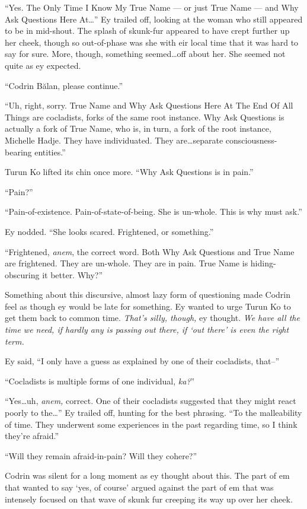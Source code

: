 ``Yes. The Only Time I Know My True Name — or just True Name — and Why Ask Questions Here At\ldots{}'' Ey trailed off, looking at the woman who still appeared to be in mid-shout. The splash of skunk-fur appeared to have crept further up her cheek, though so out-of-phase was she with eir local time that it was hard to say for sure. More, though, something seemed\ldots off about her. She seemed not quite as ey expected.

``Codrin Bălan, please continue.''

``Uh, right, sorry. True Name and Why Ask Questions Here At The End Of All Things are cocladists, forks of the same root instance. Why Ask Questions is actually a fork of True Name, who is, in turn, a fork of the root instance, Michelle Hadje. They have individuated. They are\ldots separate consciousness-bearing entities.''

Turun Ko lifted its chin once more. ``Why Ask Questions is in pain.''

``Pain?''

``Pain-of-existence. Pain-of-state-of-being. She is un-whole. This is why must ask.''

Ey nodded. ``She looks scared. Frightened, or something.''

``Frightened, \emph{anem}, the correct word. Both Why Ask Questions and True Name are frightened. They are un-whole. They are in pain. True Name is hiding-obscuring it better. Why?''

Something about this discursive, almost lazy form of questioning made Codrin feel as though ey would be late for something. Ey wanted to urge Turun Ko to get them back to common time. \emph{That's silly, though,} ey thought. \emph{We have all the time we need, if hardly any is passing out there, if `out there' is even the right term.}

Ey said, ``I only have a guess as explained by one of their cocladists, that--''

``Cocladists is multiple forms of one individual, \emph{ka?}''

``Yes\ldots uh, \emph{anem,} correct. One of their cocladists suggested that they might react poorly to the\ldots{}'' Ey trailed off, hunting for the best phrasing. ``To the malleability of time. They underwent some experiences in the past regarding time, so I think they're afraid.''

``Will they remain afraid-in-pain? Will they cohere?''

Codrin was silent for a long moment as ey thought about this. The part of em that wanted to say `yes, of course' argued against the part of em that was intensely focused on that wave of skunk fur creeping its way up over her cheek.

